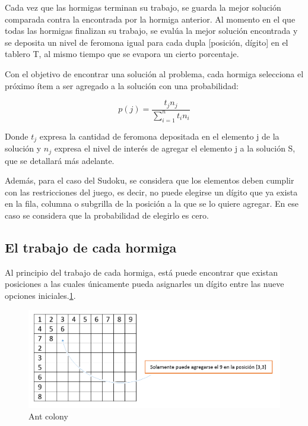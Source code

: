 \documentclass[a4paper,spanish]{article}
\begin{document}
Cada vez que las hormigas terminan su trabajo, se guarda la mejor solución comparada contra la encontrada por la hormiga anterior. 
Al momento en el que todas las hormigas finalizan su trabajo, se evalúa la mejor solución encontrada y se deposita un nivel de 
feromona igual para cada dupla [posición, dígito] en el tablero T, al mismo tiempo que se evapora un cierto porcentaje.

Con el objetivo de encontrar una solución al problema, cada hormiga selecciona el próximo ítem 
a ser agregado a la solución con una probabilidad:

\begin{equation}
	p(j) = \dfrac{t_j n_j}{\sum\limits_{i=1}^n t_i n_i}
\end{equation}

Donde $t_j$ expresa la cantidad de feromona depositada en el elemento j de la solución y $n_j$ expresa el nivel de interés de agregar 
el elemento j a la solución S, que se detallará más adelante.

Además, para el caso del Sudoku, se considera que los elementos deben cumplir con las restricciones del juego, es decir, 
no puede elegirse un dígito que ya exista en la fila, columna o subgrilla de la posición a la que se lo quiere agregar. 
En ese caso se considera que la probabilidad de elegirlo es cero.

\subsection{El trabajo de cada hormiga}

Al principio del trabajo de cada hormiga, está puede encontrar que existan posiciones a las cuales únicamente pueda asignarles 
un dígito entre las nueve opciones iniciales.\ref{img:soloundigito}.

\begin{figure}
	\centering
	\includegraphics[scale=0.4]{./img/soloundigito.png}
	\caption{Ant colony}
	\label{img:soloundigito}
\end{figure}
\end{document}
